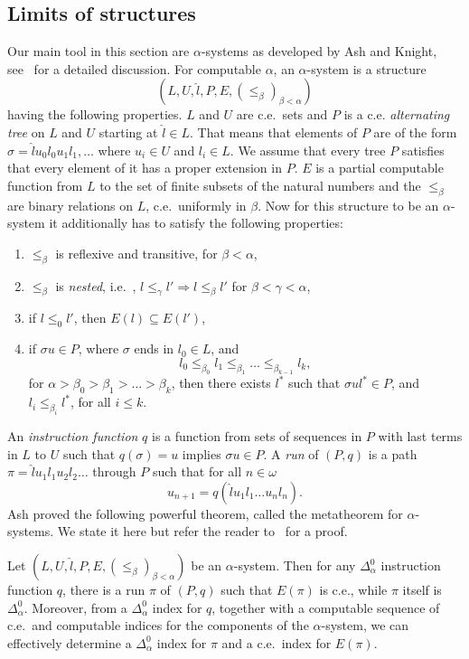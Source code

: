 \documentclass[10pt,a4paper]{amsart}
\newcommand\+[1]{\mathcal{#1}}
\renewcommand\*[1]{\mathbf{#1}}
\renewcommand\=[1]{\text{#1}}
\renewcommand\*[1]{\mathbf{#1}}
\newcommand{\Ra}{\Rightarrow}
\begin{document}
  \subsection{Limits of structures}\label{subsec:limits}
Our main tool in this section are $\alpha$-systems as developed by Ash and Knight, see~\cite{ash2000} for a detailed discussion. For computable $\alpha$, an $\alpha$-system is a structure
\[ (L,U,\hat l, P,E, (\leq_\beta)_{\beta<\alpha})\]
having the following properties. $L$ and $U$ are c.e.\ sets and $P$ is a c.e. \emph{alternating tree} on $L$ and $U$ starting at $\hat l\in L$. That means that elements of $P$ are of the form $\sigma=\hat lu_0l_0u_1l_1,\dots$ where $u_i\in U$ and $l_i\in L$. We assume that every tree $P$ satisfies that every element of it has a proper extension in $P$. $E$ is a partial computable function from $L$ to the set of finite subsets of the natural numbers and the $\leq_\beta$ are binary relations on $L$, c.e.\ uniformly in $\beta$. Now for this structure to be an $\alpha$-system it additionally has to satisfy the following properties:
\begin{enumerate}
    \item\label{it:asys1}$\leq_\beta$ is reflexive and transitive, for $\beta<\alpha$,
    \item\label{it:asys2}$\leq_\beta$ is \emph{nested}, i.e.\ , $l\leq_\gamma l'\Ra l\leq_\beta l'$ for $\beta<\gamma<\alpha$,
    \item\label{it:asys3} if $l\leq_0 l'$, then $E(l) \subseteq E(l')$,
    \item\label{it:asys4} if $\sigma u\in P$, where $\sigma$ ends in $l_0\in L$, and
    \[ l_0\leq_{\beta_0} l_1\leq_{\beta_1}\dots\leq_{\beta_{k-1}} l_k,\]
    for $\alpha>\beta_0>\beta_1>\dots >\beta_k$, then there exists $l^*$ such that $\sigma ul^*\in P$, and $l_i\leq_{\beta_i} l^*$, for all $i\leq k$.
\end{enumerate}
An \emph{instruction function} $q$ is a function from sets of sequences in $P$ with last terms in $L$ to $U$ such that $q(\sigma)=u$ implies $\sigma u\in P$. A \emph{run} of $(P,q)$ is a path $\pi=\hat l u_1l_1u_2l_2\dots$ through $P$ such that for all $n\in \omega$
\[ u_{n+1}=q(\hat lu_1l_1\dots u_nl_n).\]
Ash proved the following powerful theorem, called the metatheorem for $\alpha$-systems. We state it here but refer the reader to~\cite{ash2000} for a proof.
\begin{theorem}
Let $(L,U,\hat l, P,E, (\leq_\beta)_{\beta<\alpha})$ be an $\alpha$-system. Then for any $\Delta_\alpha^0$ instruction function $q$, there is a run $\pi$ of $(P,q)$ such that $E(\pi)$ is c.e., while $\pi$ itself is $\Delta_\alpha^0$. Moreover, from a $\Delta_\alpha^0$ index for $q$, together with a computable sequence of c.e.\ and computable indices for the components of the $\alpha$-system, we can effectively determine a $\Delta_\alpha^0$ index for $\pi$ and a c.e.\ index for $E(\pi)$.
\end{theorem}
\end{document}
